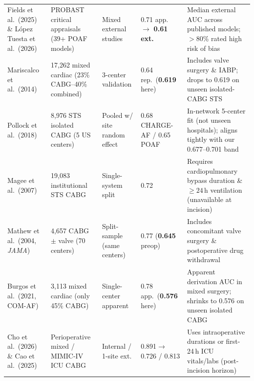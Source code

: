 \begin{table}[t]
\centering
\caption{}
\label{tab:literature_reconciliation}
\tablefont
\setlength{\tabcolsep}{3.4pt}
\begin{tabularx}{\textwidth}{@{}L{2.75cm} L{2.65cm} L{2.15cm} L{1.85cm} Y@{}}
\toprule
{} &  &  &  &  \\
\midrule
Fields et al.\ (2025) \cite{fields2025poaf} \& L\'opez Tuesta et al.\ (2026) \cite{lopeztuesta2026poaf} & PROBAST critical appraisals (39+ POAF models) & Mixed external studies & 0.71 app.\ $\to$ \textbf{0.61 ext.} & Median external AUC across published models; $>$80\% rated high risk of bias \\
Mariscalco et al.\ (2014) \cite{mariscalco2014poaf} & 17,262 mixed cardiac (23\% CABG--40\% combined) & 3-center validation & 0.64 rep.\ (\textbf{0.619} here) & Includes valve surgery \& IABP; drops to 0.619 on unseen isolated-CABG STS \\
Pollock et al.\ (2018) \cite{pollock2018chargeaf} & 8,976 STS isolated CABG (5 US centers) & Pooled w/ site random effect & 0.68 CHARGE-AF / 0.65 POAF & In-network 5-center fit (not unseen hospitals); aligns tightly with our 0.677--0.701 band \\
Magee et al.\ (2007) \cite{magee2007atrial} & 19,083 institutional STS CABG & Single-system split & 0.72 & Requires cardiopulmonary bypass duration \& $\ge 24$\,h ventilation (unavailable at incision) \\
Mathew et al.\ (2004, \emph{JAMA}) \cite{mathew2004multicenter} & 4,657 CABG $\pm$ valve (70 centers) & Split-sample (same centers) & 0.77 (\textbf{0.645} preop) & Includes concomitant valve surgery \& postoperative drug withdrawal \\
Burgos et al.\ (2021, COM-AF) \cite{burgos2021comaf} & 3,113 mixed cardiac (only 45\% CABG) & Single-center apparent & 0.78 app.\ (\textbf{0.576} here) & Apparent derivation AUC in mixed surgery; shrinks to 0.576 on unseen isolated CABG \\
Cho et al.\ (2026) \cite{cho2026poaf} \& Cao et al.\ (2025) \cite{cao2025mimic4} & Perioperative mixed / MIMIC-IV ICU CABG & Internal / 1-site ext. & 0.891$\to$0.726 / 0.813 & Uses intraoperative durations or first-24\,h ICU vitals/labs (post-incision horizon) \\

\end{tabularx}
\end{table}
